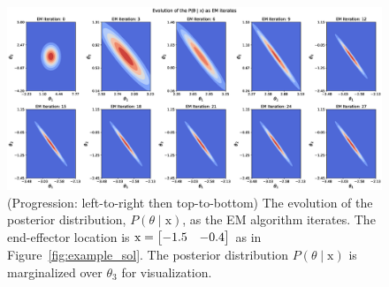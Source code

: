 \begin{figure}[t]
    \centering
	\includegraphics[width=\textwidth]{./figures/posterior_evolution.eps}
    \caption{(Progression: left-to-right then top-to-bottom) The evolution of
    the posterior distribution, $P(\theta \mid \mathrm{x})$, as the EM algorithm
    iterates. The end-effector location is $\mathrm{x} = \begin{bmatrix}-1.5 & -0.4\end{bmatrix}$ as
    in Figure~\ref{fig:example_sol}. The posterior distribution $P(\theta \mid
    \mathrm{x})$ is marginalized over $\theta_3$ for visualization.}
    \label{fig:belief_evolution}
\end{figure}